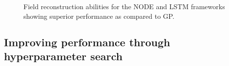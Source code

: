 \documentclass[preprint,12pt]{elsarticle}
\begin{document}
\begin{figure}
	\centering
	\caption{Field reconstruction abilities for the NODE and LSTM frameworks showing superior performance as compared to GP.}
	\label{Figure12}
\end{figure}

\subsection{Improving performance through hyperparameter search}
\end{document}

